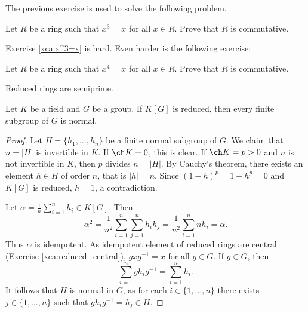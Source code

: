 The previous exercise is used to solve the following problem.

\begin{exercise}
\label{xca:x^3=x}
    Let $R$ be a ring such that $x^3=x$ for all $x\in R$. Prove that
    $R$ is commutative. 
\end{exercise}

Exercise \ref{xca:x^3=x} is hard. 
Even harder is the following exercise:

\begin{exercise}
\label{xca:x^4=x}
    Let $R$ be a ring such that $x^4=x$ for all $x\in R$. Prove
    that $R$ is commutative. 
\end{exercise}



\begin{exercise}
\label{xca:reduced=>semiprime}
    Reduced rings are semiprime.
\end{exercise}
 
\begin{theorem}
\label{thm:reduced}
    Let $K$ be a field and $G$ be a group. If $K[G]$
    is reduced, then every finite subgroup of $G$ is normal. 
\end{theorem}

\begin{proof}
    Let $H=\{h_1,\dots,h_n\}$ be a finite normal subgroup of $G$. 
    We claim that $n=|H|$ is invertible in $K$. If $\ch K=0$, this 
    is clear. If $\ch K=p>0$ and $n$ is not invertible in $K$, 
    then $p$ divides $n=|H|$. By Cauchy's theorem, 
    there exists an element $h\in H$ of order $n$, that is 
    $|h|=n$. Since $(1-h)^p=1-h^p=0$ and $K[G]$ is reduced,
    $h=1$, a contradiction. 
    
    Let $\alpha=\frac{1}{n}\sum_{i=1}^nh_i\in K[G]$. Then
    \[
    \alpha^2=\frac{1}{n^2}\sum_{i=1}^n\sum_{j=1}^nh_ih_j
    =\frac{1}{n^2}\sum_{i=1}^nnh_i=\alpha.
    \]
    Thus $\alpha$ is idempotent. As idempotent 
    element of reduced rings are central (Exercise \ref{xca:reduced_central}), 
    $gxg^{-1}=x$ for all $g\in G$. If $g\in G$, 
    then 
    \[
    \sum_{i=1}^n gh_ig^{-1}=\sum_{i=1}^n h_i.
    \]
    It follows that $H$ is normal in $G$, 
    as for each $i\in\{1,\dots,n\}$ 
    there exists $j\in\{1,\dots,n\}$ such that 
    $gh_ig^{-1}=h_j\in H$. 
\end{proof}

